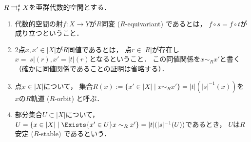     \begin{Def}
        $R \mathrel{\mathop{\rightrightarrows}^{s}_{t}} X$を亜群代数的空間とする．
        \begin{enumerate}
        \item
            代数的空間の射$f \colon X \to Y$が$R$同変 ($R$-equivariant) であるとは，
            $f \circ s=f \circ t$が成り立つということ．

        \item
            $2$点$x,x' \in |X|$が$R$同値であるとは，
            点$r \in |R|$が存在し$x=|s|(r), x'=|t|(r)$となるということ．
            この同値関係を$x \sim_{R} x'$と書く
            （確かに同値関係であることの証明は省略する）．

        \item
            点$x \in |X|$について，
            集合$R(x):=\{ x' \in |X| \mid x \sim_{R} x' \}=|t|(|s|^{-1}(x))$を
            $x$の$R$軌道 ($R$-orbit) と呼ぶ．

        \item
            部分集合$U \subset |X|$について，
            $U=\{x \in |X| \mid \Exists{x' \in U} x \sim_{R} x'\}=|t|(|s|^{-1}(U))$であるとき，
            $U$は$R$安定 ($R$-stable) であるという．
        \end{enumerate}
    \end{Def}

